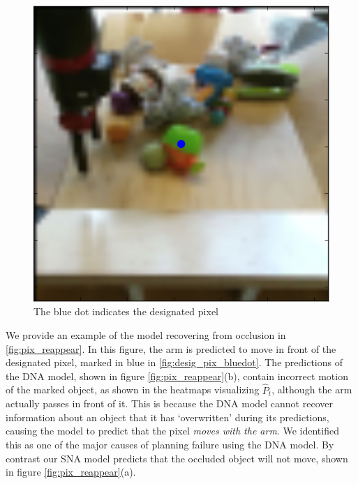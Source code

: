  \begin{figure}
	\centering
	\includegraphics[width=0.37\columnwidth]{images_sna/occlusionaware/img_desigpixb0.png}
	\caption{The blue dot indicates the designated pixel}
	\label{fig:desig_pix_bluedot}
\end{figure}

We provide an example of the model recovering from occlusion in \autoref{fig:pix_reappear}. In this figure, the arm is predicted to move in front of the designated pixel, marked in blue in \autoref{fig:desig_pix_bluedot}. The predictions of the DNA model, shown in figure \autoref{fig:pix_reappear}(b), contain incorrect motion of the marked object, as shown in the heatmaps visualizing $\hat{P}_t$, although the arm actually passes in front of it. This is because the DNA model cannot recover information about an object that it has `overwritten' during its predictions, causing the model to predict that the pixel \emph{moves with the arm}. We identified this as one of the major causes of planning failure using the DNA model. By contrast our SNA model predicts that the occluded object will not move, shown in figure  \autoref{fig:pix_reappear}(a).

% 

